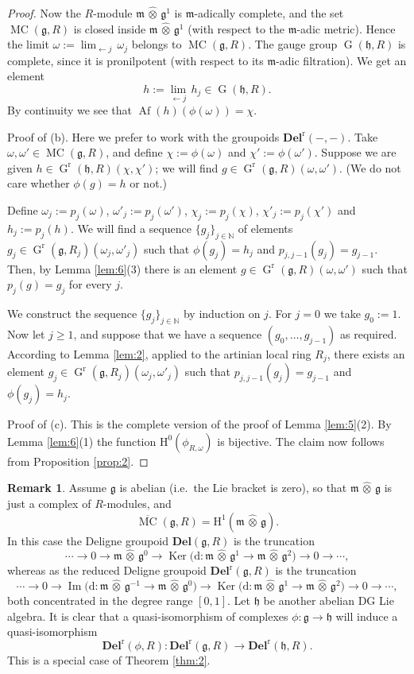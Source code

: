 \documentclass[a4paper,10pt]{amsart}
\theoremstyle{definition}
\newtheorem{rem}[equation]{Remark}
\numberwithin{equation}{section}
\newcommand{\opn}{\operatorname}
\newcommand{\ol}{\overline}
\newcommand{\mfrak}[1]{\mathfrak{#1}}
\newcommand{\mbf}[1]{\mathbf{#1}}
\newcommand{\mrm}[1]{\mathrm{#1}}
\newcommand{\mbb}[1]{\mathbb{#1}}
\newcommand{\what}[1]{\widehat{#1}}
\newcommand{\hatotimes}{\, \what{\otimes} \,}
\newcommand{\hot}{\hatotimes}
\newcommand{\N}{\mbb{N}}
\newcommand{\g}{\mfrak{g}}
\newcommand{\m}{\mfrak{m}}
\newcommand{\h}{\mfrak{h}}
\renewcommand{\d}{\mrm{d}}
\newcommand{\om}{\omega}
\begin{document}
\begin{proof}
Now the $R$-module $\m \hatotimes \g^1$ is $\m$-adically complete, 
and the set $\opn{MC}(\g, R)$ is closed inside 
$\m \hatotimes \g^1$ (with respect to the $\m$-adic metric). 
Hence the limit 
$\om := \lim_{\leftarrow j}\, \om_j$
belongs to $\opn{MC}(\g, R)$. 
The gauge group $\opn{G}(\h, R)$ is complete, since it is pronilpotent 
(with respect to its $\m$-adic filtration).
We get an element 
\[ h := \lim_{\leftarrow j}\, h_j \in \opn{G}(\h, R) . \]
By continuity we see that 
$\opn{Af}(h)(\phi(\om)) = \chi$.

\medskip \noindent
Proof of (b). Here we prefer to work with the groupoids
$\mbf{Del}^{\mrm{r}}(-,-)$.
Take $\om, \om' \in \opn{MC}(\g, R)$, and define 
$\chi := \phi(\om)$ and $\chi' := \phi(\om')$. 
Suppose we are given 
$h \in \opn{G}^{\mrm{r}}(\h, R)(\chi, \chi')$;
we will find 
$g \in \opn{G}^{\mrm{r}}(\g, R)(\om, \om')$. 
(We do not care whether $\phi(g) = h$ or not.)

Define 
$\om_j := p_j(\om)$,
$\om'_j := p_j(\om')$,
$\chi_j := p_j(\chi)$,
$\chi'_j := p_j(\chi')$
and 
$h_j := p_j(h)$. 
We will find a sequence $\{ g_j \}_{j \in \N}$ of elements 
$g_j \in  \opn{G}^{\mrm{r}}(\g, R_j)(\om_j, \om'_j)$
such that 
$\phi(g_j) = h_j$
and 
$p_{j, j-1}(g_j) = g_{j-1}$.
Then, by Lemma \ref{lem:6}(3) there is an element 
$g \in \opn{G}^{\mrm{r}}(\g, R)(\om, \om')$
such that $p_j(g) = g_j$ for every $j$. 

We construct the sequence $\{ g_j \}_{j \in \N}$ by induction on $j$. For
$j = 0$ we take $g_0 := 1$. 
Now let $j \geq 1$, and suppose that we have a sequence 
$(g_0, \ldots, g_{j-1})$ as required. According to Lemma \ref{lem:2}, applied
to the artinian local ring $R_j$, there exists an element 
$g_j \in \opn{G}^{\mrm{r}}(\g, R_j)(\om_j, \om'_j)$
such that $p_{j, j-1}(g_j) = g_{j-1}$ and $\phi(g_j) = h_j$.

\medskip \noindent
Proof of (c). This is the complete version of the proof of Lemma \ref{lem:5}(2).
By Lemma \ref{lem:6}(1) the function 
$\mrm{H}^0(\phi_{R, \om})$ is bijective. The claim now follows from Proposition 
\ref{prop:2}.
\end{proof}

\begin{rem}
Assume $\g$ is abelian (i.e.\ the Lie bracket is zero), so that 
$\m \hot \g$ is just a complex of $R$-modules, and 
\[ \ol{\opn{MC}}(\g, R) = \mrm{H}^1 (\m \hot \g) . \]
In this case the Deligne groupoid $\mbf{Del}(\g, R)$ is the truncation 
\[ \cdots \to 0 \to \m \hot \g^0 \to 
\opn{Ker} \bigl( \d : \m \hot \g^{1} \to \m \hot \g^2 \bigr)
\to 0 \to \cdots , \]
whereas as the reduced Deligne groupoid $\mbf{Del}^{\mrm{r}}(\g, R)$
is the truncation
\[ \cdots \to 0 \to 
\opn{Im} \bigl( \d : \m \hot \g^{-1} \to \m \hot \g^0 \bigr)
\to 
\opn{Ker} \bigl( \d : \m \hot \g^{1} \to \m \hot \g^2 \bigr)
\to 0 \to \cdots , \]
both concentrated in the degree range $[0, 1]$.
Let $\h$ be another abelian DG Lie algebra. 
It is clear that a quasi-isomorphism of complexes $\phi : \g \to \h$ will
induce a quasi-isomorphism 
\[ \mbf{Del}^{\mrm{r}}(\phi, R) : 
\mbf{Del}^{\mrm{r}}(\g, R) \to \mbf{Del}^{\mrm{r}}(\h, R) . \]
This is a special case of Theorem \ref{thm:2}.
\end{rem}
\end{document}
